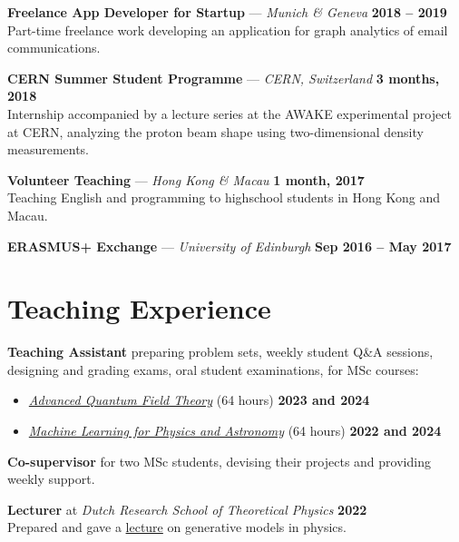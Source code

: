 \documentclass[11pt]{article}
\newcommand{\dateright}[1]{\hfill \textbf{#1}}
\begin{document}
\vspace{0.2cm}

\noindent
\textbf{Freelance App Developer for Startup} — \textit{Munich \& Geneva} \dateright{2018 -- 2019} \\
Part-time freelance work developing an
application for graph analytics of email communications.

\vspace{0.2cm}

\noindent
\textbf{CERN Summer Student Programme} — \textit{CERN, Switzerland} \dateright{3 months, 2018} \\
Internship accompanied by a lecture series at the AWAKE experimental project at CERN,
analyzing the proton beam shape using two-dimensional density measurements.

\vspace{0.2cm}

\noindent
\textbf{Volunteer Teaching} — \textit{Hong Kong \& Macau} \dateright{1 month, 2017} \\
Teaching English and programming to highschool students in Hong Kong and Macau.
\vspace{0.2cm}

\noindent
\textbf{ERASMUS+ Exchange} — \textit{University of Edinburgh} \dateright{Sep 2016 -- May 2017}



\section*{Teaching Experience}
\noindent
\textbf{Teaching Assistant} preparing problem sets, weekly student Q\&A sessions, designing and grading exams, oral student examinations, for MSc courses:
\begin{itemize}
    \item \href{https://coursecatalogue.uva.nl/xmlpages/page/2023-2024-en/search-course/course/109196}{\textit{Advanced Quantum Field Theory}} (64 hours) \dateright{2023 and 2024}
    \item \href{https://coursecatalogue.uva.nl/xmlpages/page/2022-2023-en/search-course/course/99394}{\textit{Machine Learning for Physics and Astronomy}} (64 hours) \dateright{2022 and 2024}
\end{itemize}

\vspace{0.2cm}
\noindent
\textbf{Co-supervisor} for two MSc students, devising their projects and providing weekly support.

\vspace{0.2cm}
\noindent
\textbf{Lecturer} at \textit{Dutch Research School of Theoretical Physics} \dateright{2022} \\
Prepared and gave a \href{https://www.drstp.nl/wp-content/uploads/2022/06/THEP-Schedule-2022.pdf}{lecture} on generative models in physics.
\end{document}

